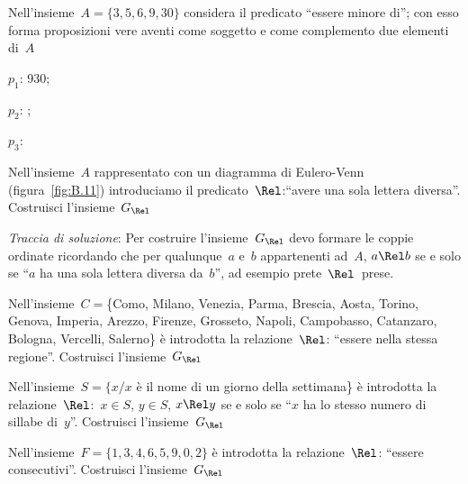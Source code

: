 \begin{multicols}{2}

\begin{esercizio}
\label{ese:B.2}
Nell'insieme~$A = \{ 3,5,6,9,30 \}$ considera il predicato ``essere minore 
di''; 
con esso forma proposizioni vere aventi come soggetto e come complemento due 
elementi di~$A$
\begin{enumeratea}
 \item $p_1$: 930;
\item $p_2$: \dotfill;
\item $p_3$: \dotfill
\end{enumeratea}
\end{esercizio}

\begin{esercizio}
\label{ese:B.3}
Nell'insieme~$A$ rappresentato con un diagramma di Eulero-Venn 
(figura~\ref{fig:B.11}) introduciamo il predicato~$\Rel$:``avere
una sola lettera diversa''. Costruisci l'insieme~$G_\Rel$

\emph{Traccia di soluzione}:
Per costruire l'insieme~$G_\Rel$ devo formare le coppie ordinate ricordando 
che per qualunque~$a$ e~$b$ appartenenti ad~$A$, $a \Rel b$
se e solo se ``$a$ ha una sola lettera diversa da~$b$'', ad esempio 
prete~$ \Rel$~prese.
\end{esercizio}

\begin{esercizio}
\label{ese:B.4}
Nell'insieme~$C = $\{Como, Milano, Venezia, Parma, Brescia, Aosta, Torino, 
Genova, Imperia, Arezzo, Firenze, Grosseto, Napoli, Campobasso, Catanzaro, 
Bologna, Vercelli, Salerno\} è introdotta la relazione~$\Rel$: 
``essere nella stessa regione''. Costruisci l'insieme~$G_\Rel$
\end{esercizio}

\begin{esercizio}
\label{ese:B.5}
Nell'insieme~$S = \{ x / x$ è il nome di un giorno della settimana\} è 
introdotta la relazione~$\Rel$:~$x \in S$, $y \in S$, $x \Rel y$ se e solo 
se ``$x$ ha lo stesso numero di sillabe di~$y$''. Costruisci l'insieme~$G_\Rel$
\end{esercizio}

\begin{esercizio}
\label{ese:B.6}
Nell'insieme~$F = \{ 1, 3, 4, 6, 5, 9, 0, 2 \}$ è introdotta la 
relazione~$\Rel$: ``essere consecutivi''. Costruisci l'insieme~$G_\Rel$
\end{esercizio}
\end{multicols}

